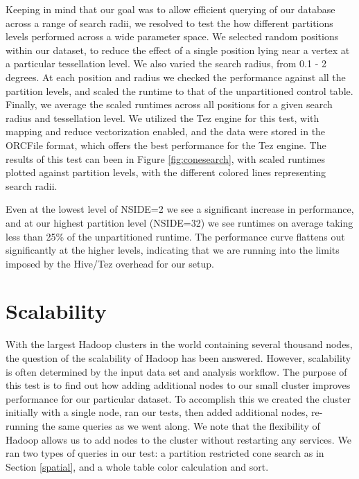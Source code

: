 \documentclass[11pt,twoside]{article}
\begin{document}
Keeping in mind that our goal was to allow efficient querying of our database across a range of search radii,
we resolved to test the how different partitions levels performed across a wide parameter space.  We selected
random positions within our dataset, to reduce the effect of a single position lying near a vertex at a
particular tessellation level.  We also varied the search radius, from 0.1 - 2 degrees.  At each position and
radius we checked the performance against all the partition levels, and scaled the runtime to that of the
unpartitioned control table.  Finally, we average the scaled runtimes across all positions for a given search
radius and tessellation level.  We utilized the Tez engine for this test, with mapping and reduce
vectorization enabled, and the data were stored in the ORCFile format, which offers the best performance for
the Tez engine.  The results of this test can been in Figure \ref{fig:conesearch}, with scaled runtimes
plotted against partition levels, with the different colored lines representing search radii.


Even at the lowest level of NSIDE=2 we see a significant increase in performance, and at our highest partition
level (NSIDE=32) we see runtimes on average taking less than 25\% of the unpartitioned runtime.  The
performance curve flattens out significantly at the higher levels, indicating that we are running into the
limits imposed by the Hive/Tez overhead for our setup.

\section{Scalability}
With the largest Hadoop clusters in the world containing several thousand nodes, the question of the
scalability of Hadoop has been answered. However, scalability is often determined by the input data set and
analysis workflow. The purpose of this test is to find out how adding additional nodes to our small cluster
improves performance for our particular dataset.  To accomplish this we created the cluster initially with a
single node, ran our tests, then added additional nodes, re-running the same queries as we went along.  We
note that the flexibility of Hadoop allows us to add nodes to the cluster without restarting any services.  We
ran two types of queries in our test: a partition restricted cone search as in Section \ref{spatial}, and a
whole table color calculation and sort.
\end{document}
